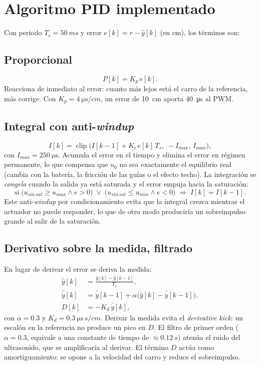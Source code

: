 \documentclass[conference,10pt]{IEEEtran}
\begin{document}
\section{Algoritmo PID implementado}
Con periodo $T_s=\SI{50}{ms}$ y error $e[k]=r-\hat y[k]$ (en cm), los términos son:

\subsection{Proporcional}
\begin{equation}
P[k]=K_p\,e[k].
\end{equation}
Reacciona de inmediato al error: cuanto más lejos está el carro de la referencia, más corrige. Con $K_p=\SI{4}{\micro\second/cm}$, un error de \SI{10}{cm} aporta \SI{40}{\micro\second} al PWM.

\subsection{Integral con anti-\textit{windup}}
\begin{equation}
I[k]=\operatorname{clip}\bigl(I[k-1]+K_i\,e[k]\,T_s,\;-I_{max},\,I_{max}\bigr),
\end{equation}
con $I_{max}=\SI{250}{\micro\second}$. Acumula el error en el tiempo y elimina el error en régimen permanente, lo que compensa que $u_0$ no sea exactamente el equilibrio real (cambia con la batería, la fricción de las guías o el efecto techo). La integración se \textit{congela} cuando la salida ya está saturada y el error empuja hacia la saturación:
\begin{equation}
\text{si}\;\bigl(u_{sin\,sat}\ge u_{max}\land e>0\bigr)\;\lor\;\bigl(u_{sin\,sat}\le u_{min}\land e<0\bigr)\;\Rightarrow\; I[k]=I[k-1].
\end{equation}
Este anti-\textit{windup} por condicionamiento evita que la integral crezca mientras el actuador no puede responder, lo que de otro modo produciría un sobreimpulso grande al salir de la saturación.

\subsection{Derivativo sobre la medida, filtrado}
En lugar de derivar el error se deriva la medida:
\begin{align}
\dot{\hat y}[k]&=\frac{\hat y[k]-\hat y[k-1]}{T_s},\\
\bar{\dot y}[k]&=\bar{\dot y}[k-1]+\alpha\bigl(\dot{\hat y}[k]-\bar{\dot y}[k-1]\bigr),\\
D[k]&=-K_d\,\bar{\dot y}[k],
\end{align}
con $\alpha=0.3$ y $K_d=\SI{0.3}{\micro\second\,s/cm}$. Derivar la medida evita el \textit{derivative kick}: un escalón en la referencia no produce un pico en $D$. El filtro de primer orden ($\alpha=0.3$, equivale a una constante de tiempo de $\approx\SI{0.12}{s}$) atenúa el ruido del ultrasonido, que se amplificaría al derivar. El término $D$ actúa como amortiguamiento: se opone a la velocidad del carro y reduce el sobreimpulso.
\end{document}
